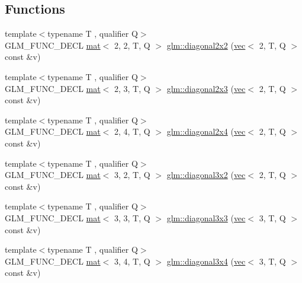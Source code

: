 \subsection*{Functions}
\begin{DoxyCompactItemize}
\item 
{\footnotesize template$<$typename T , qualifier Q$>$ }\\G\+L\+M\+\_\+\+F\+U\+N\+C\+\_\+\+D\+E\+CL \hyperlink{structglm_1_1mat}{mat}$<$ 2, 2, T, Q $>$ \hyperlink{group__gtx__matrix__operation_ga58a32a2beeb2478dae2a721368cdd4ac}{glm\+::diagonal2x2} (\hyperlink{structglm_1_1vec}{vec}$<$ 2, T, Q $>$ const \&v)
\item 
{\footnotesize template$<$typename T , qualifier Q$>$ }\\G\+L\+M\+\_\+\+F\+U\+N\+C\+\_\+\+D\+E\+CL \hyperlink{structglm_1_1mat}{mat}$<$ 2, 3, T, Q $>$ \hyperlink{group__gtx__matrix__operation_gab69f900206a430e2875a5a073851e175}{glm\+::diagonal2x3} (\hyperlink{structglm_1_1vec}{vec}$<$ 2, T, Q $>$ const \&v)
\item 
{\footnotesize template$<$typename T , qualifier Q$>$ }\\G\+L\+M\+\_\+\+F\+U\+N\+C\+\_\+\+D\+E\+CL \hyperlink{structglm_1_1mat}{mat}$<$ 2, 4, T, Q $>$ \hyperlink{group__gtx__matrix__operation_ga30b4dbfed60a919d66acc8a63bcdc549}{glm\+::diagonal2x4} (\hyperlink{structglm_1_1vec}{vec}$<$ 2, T, Q $>$ const \&v)
\item 
{\footnotesize template$<$typename T , qualifier Q$>$ }\\G\+L\+M\+\_\+\+F\+U\+N\+C\+\_\+\+D\+E\+CL \hyperlink{structglm_1_1mat}{mat}$<$ 3, 2, T, Q $>$ \hyperlink{group__gtx__matrix__operation_ga832c805d5130d28ad76236958d15b47d}{glm\+::diagonal3x2} (\hyperlink{structglm_1_1vec}{vec}$<$ 2, T, Q $>$ const \&v)
\item 
{\footnotesize template$<$typename T , qualifier Q$>$ }\\G\+L\+M\+\_\+\+F\+U\+N\+C\+\_\+\+D\+E\+CL \hyperlink{structglm_1_1mat}{mat}$<$ 3, 3, T, Q $>$ \hyperlink{group__gtx__matrix__operation_ga5487ff9cdbc8e04d594adef1bcb16ee0}{glm\+::diagonal3x3} (\hyperlink{structglm_1_1vec}{vec}$<$ 3, T, Q $>$ const \&v)
\item 
{\footnotesize template$<$typename T , qualifier Q$>$ }\\G\+L\+M\+\_\+\+F\+U\+N\+C\+\_\+\+D\+E\+CL \hyperlink{structglm_1_1mat}{mat}$<$ 3, 4, T, Q $>$ \hyperlink{group__gtx__matrix__operation_gad7551139cff0c4208d27f0ad3437833e}{glm\+::diagonal3x4} (\hyperlink{structglm_1_1vec}{vec}$<$ 3, T, Q $>$ const \&v)

\end{DoxyCompactItemize}
